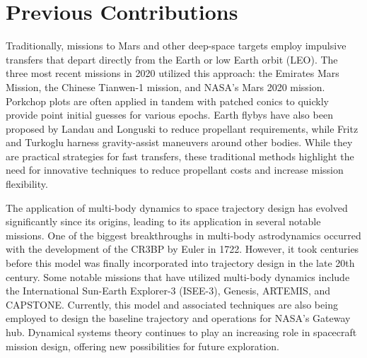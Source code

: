 \section{Previous Contributions}
Traditionally, missions to Mars and other deep-space targets employ impulsive transfers that depart
directly from the Earth or low Earth orbit (LEO). The three most recent missions in 2020 utilized
this approach: the Emirates Mars Mission\cite{Amiri:2022}, the Chinese Tianwen-1
mission\cite{Yang:2022}, and NASA's Mars 2020 mission\cite{Farley:2020}. Porkchop plots are often
applied in tandem with patched conics to quickly provide point initial guesses for various
epochs\cite{Drake:2009}. Earth flybys have also been proposed by Landau and Longuski to reduce
propellant requirements\cite{Landau:2006}, while Fritz and Turkoglu harness gravity-assist
maneuvers around other bodies\cite{Fritz:2016}. While they are practical strategies for fast
transfers, these traditional methods highlight the need for innovative techniques to reduce
propellant costs and increase mission flexibility.

The application of multi-body dynamics to space trajectory design has evolved significantly since
its origins, leading to its application in several notable missions. One of the biggest
breakthroughs in multi-body astrodynamics occurred with the development of the CR3BP by Euler in
1722\cite{BarrowGreen:1997}. However, it took centuries before this model was finally incorporated
into trajectory design in the late 20th century. Some notable missions that have utilized
multi-body dynamics include the International Sun-Earth Explorer-3 (ISEE-3)\cite{Farquhar:1984},
Genesis\cite{Lo:2001}, ARTEMIS\cite{Woodard:2009}, and CAPSTONE\cite{Cheetham:2021}. Currently,
this model and associated techniques are also being employed to design the baseline trajectory and
operations for NASA's Gateway hub\cite{Zamora:2024,Boudad:2022,ZimovanSpreen:2022}. Dynamical
systems theory continues to play an increasing role in spacecraft mission design, offering new
possibilities for future exploration.

